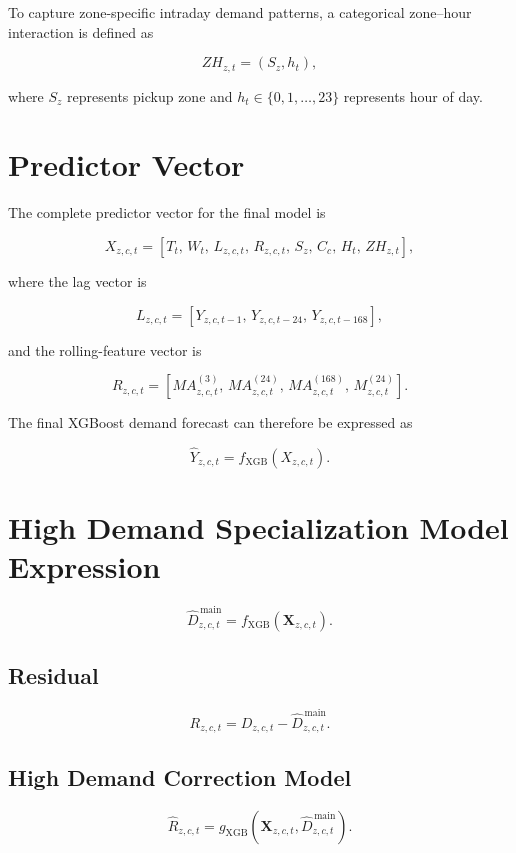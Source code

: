 \documentclass{article}
\begin{document}
To capture zone-specific intraday demand patterns, a categorical
zone--hour interaction is defined as

\[
ZH_{z,t}
=
(S_z,h_t),
\]

where $S_z$ represents pickup zone and
$h_t \in \{0,1,\ldots,23\}$ represents hour of day.


\section{Predictor Vector}

The complete predictor vector for the final model is

\[
X_{z,c,t}
=
\left[
T_t,\,
W_t,\,
L_{z,c,t},\,
R_{z,c,t},\,
S_z,\,
C_c,\,
H_t,\,
ZH_{z,t}
\right],
\]

where the lag vector is

\[
L_{z,c,t}
=
\left[
Y_{z,c,t-1},\,
Y_{z,c,t-24},\,
Y_{z,c,t-168}
\right],
\]

and the rolling-feature vector is

\[
R_{z,c,t}
=
\left[
MA^{(3)}_{z,c,t},\,
MA^{(24)}_{z,c,t},\,
MA^{(168)}_{z,c,t},\,
M^{(24)}_{z,c,t}
\right].
\]

The final XGBoost demand forecast can therefore be expressed as

\[
\widehat{Y}_{z,c,t}
=
f_{\mathrm{XGB}}
\left(
X_{z,c,t}
\right).
\]
\section{High Demand Specialization Model Expression}

\begin{equation}
\widehat{D}_{z,c,t}^{\,\mathrm{main}}
=
f_{\mathrm{XGB}}(\mathbf{X}_{z,c,t}).
\end{equation}

\subsection{Residual}

\begin{equation}
R_{z,c,t}
=
D_{z,c,t}
-
\widehat{D}_{z,c,t}^{\,\mathrm{main}}.
\end{equation}
\subsection{High Demand Correction Model}
\begin{equation}
\widehat{R}_{z,c,t}
=
g_{\mathrm{XGB}}
\left(
\mathbf{X}_{z,c,t},
\widehat{D}_{z,c,t}^{\,\mathrm{main}}
\right).
\end{equation}
\end{document}
